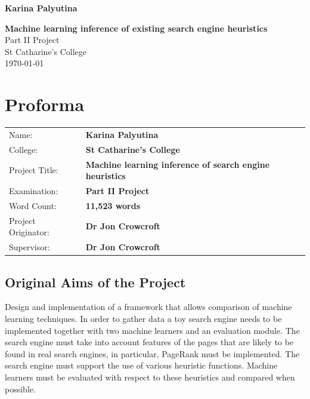 \documentclass[12pt,notitlepage,twoside]{scrbook}
\begin{document}





\pagestyle{empty}

\hfill{\LARGE \bf Karina Palyutina}

\vspace*{60mm}
\begin{center}
\Huge
{\bf Machine learning inference of existing search engine heuristics} \\
\vspace*{5mm}
Part II Project \\
\vspace*{5mm}
St Catharine's College \\
\vspace*{5mm}
\today  %
\end{center}



\setcounter{page}{1}
\pagestyle{plain}

\chapter*{Proforma}

{\large
\begin{tabular}{ll}
Name:               & \bf Karina Palyutina                       \\
College:            & \bf St Catharine's College                     \\
Project Title:      & \bf Machine learning inference of search engine heuristics \\
Examination:        & \bf Part II Project        \\
Word Count:         & \bf 11,523 words     \\
Project Originator: & \bf Dr Jon Crowcroft                    \\
Supervisor:         & \bf Dr Jon Crowcroft                  \\ 
\end{tabular}
}


\newpage


\section*{Original Aims of the Project}
Design and implementation of a framework that allows comparison of machine learning
techniques. In order to gather data a toy search engine needs to be implemented together
with two machine learners and an evaluation module. The search engine must take into account
features of the pages that are likely to be found in real search engines, in particular,
PageRank must be implemented. The search engine must support the use of various heuristic
functions. Machine learners must be evaluated with respect to these heuristics and
compared when possible. 
\end{document}
